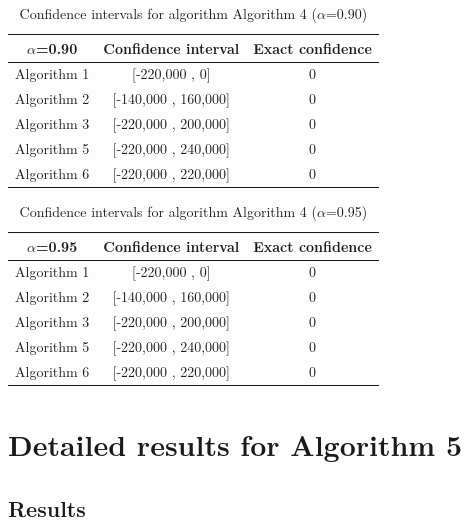 \documentclass[a4paper,10pt]{article}
\begin{document}
\begin{table}[!htp]
\centering\small
\begin{tabular}{
|c|c|c|}
\hline
 $\alpha$=0.90 & Confidence interval & Exact confidence \\ \hline 
Algorithm 1 & [-220,000 , 0] & 0\\ \hline 
Algorithm 2 & [-140,000 , 160,000] & 0\\ \hline 
Algorithm 3 & [-220,000 , 200,000] & 0\\ \hline 
Algorithm 5 & [-220,000 , 240,000] & 0\\ \hline 
Algorithm 6 & [-220,000 , 220,000] & 0\\ \hline 

\end{tabular}
\caption{Confidence intervals for algorithm Algorithm 4 ($\alpha$=0.90)}
\end{table}
\begin{table}[!htp]
\centering\small
\begin{tabular}{
|c|c|c|}
\hline
 $\alpha$=0.95 & Confidence interval & Exact confidence \\ \hline 
Algorithm 1 & [-220,000 , 0] & 0\\ \hline 
Algorithm 2 & [-140,000 , 160,000] & 0\\ \hline 
Algorithm 3 & [-220,000 , 200,000] & 0\\ \hline 
Algorithm 5 & [-220,000 , 240,000] & 0\\ \hline 
Algorithm 6 & [-220,000 , 220,000] & 0\\ \hline 

\end{tabular}
\caption{Confidence intervals for algorithm Algorithm 4 ($\alpha$=0.95)}
\end{table}

 \clearpage 


\section{Detailed results for Algorithm 5}


\subsection{Results}
\end{document}
